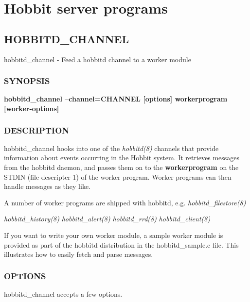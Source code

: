 %
\chapter{Hobbit server programs}

%

\section{HOBBITD\_CHANNEL}

 hobbitd\_channel - Feed a hobbitd channel to a worker module 

\subsection{SYNOPSIS}
\textbf{hobbitd\_channel --channel=CHANNEL [options] workerprogram [worker-options]}


 
\subsection{DESCRIPTION}
 hobbitd\_channel hooks into one of the \emph{hobbitd(8)} channels
 that provide information about events occurring in the Hobbit
 system. It retrieves messages from the hobbitd daemon, and passes
 them on to the \textbf{workerprogram} on the STDIN (file descripter
 1) of the worker program. Worker programs can then handle messages as
 they like. 


  A number of worker programs are shipped with hobbitd,
  e.g. \emph{hobbitd\_filestore(8)}

 \emph{hobbitd\_history(8)}
 \emph{hobbitd\_alert(8)}
 \emph{hobbitd\_rrd(8)}
 \emph{hobbitd\_client(8)}



  If you want to write your own worker module, a sample worker module
  is provided as part of the hobbitd distribution in the
  hobbitd\_sample.c file. This illustrates how to easily fetch and
  parse messages. 



 
\subsection{OPTIONS}
 hobbitd\_channel accepts a few options. 

